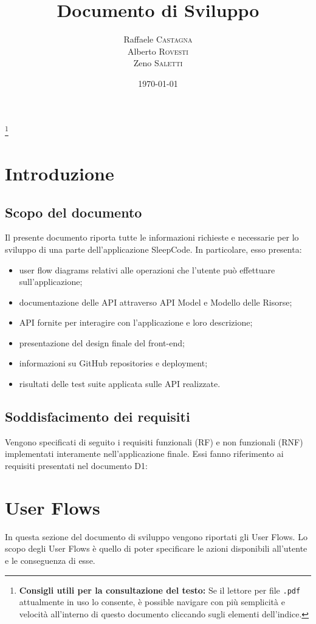 \documentclass[11pt, a4paper]{article}
\title{Documento di Sviluppo}
\author{Raffaele \textsc{Castagna}\\
Alberto \textsc{Rovesti}\\
Zeno \textsc{Saletti}}
\date{\today}
\theoremstyle{definition}
\newcommand\blfootnote[1]{%
  \begingroup
  \renewcommand\thefootnote{}\footnote{#1}%
  \addtocounter{footnote}{-1}%
  \endgroup
}
\begin{document}


\tableofcontents\blfootnote{\textbf{Consigli utili per la consultazione del testo:} Se il lettore per file \texttt{.pdf} attualmente in uso lo consente, è possible navigare con più semplicità e velocità all'interno di questo documento cliccando sugli elementi dell'indice.}

\newpage
\section{Introduzione}
\subsection{Scopo del documento}
Il presente documento riporta tutte le informazioni richieste e necessarie per lo sviluppo
di una parte dell'applicazione SleepCode. In particolare, esso presenta:
\begin{itemize}
  \item user flow diagrams relativi alle operazioni che l'utente può effettuare sull'applicazione;
  \item documentazione delle API attraverso API Model e Modello delle Risorse;
  \item API fornite per interagire con l'applicazione e loro descrizione;
  \item presentazione del design finale del front-end;
  \item informazioni su GitHub repositories e deployment;
  \item risultati delle test suite applicata sulle API realizzate.
\end{itemize}

\subsection{Soddisfacimento dei requisiti}
Vengono specificati di seguito i requisiti funzionali (RF) e non funzionali
(RNF) implementati interamente nell'applicazione finale. Essi fanno riferimento
ai requisiti presentati nel documento D1:

\newpage
\section{User Flows}
In questa sezione del documento di sviluppo vengono riportati gli User Flows. Lo scopo degli User Flows
è quello di poter specificare le azioni disponibili all'utente e le conseguenza di esse.
\end{document}
